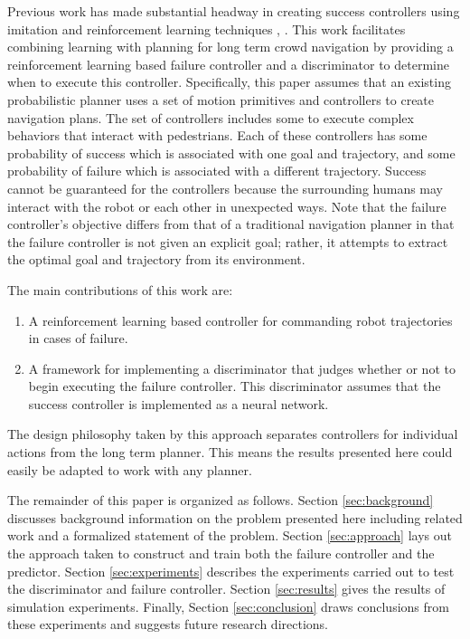 \documentclass[letterpaper]{article}
\begin{document}
		Previous work has made substantial headway in creating success controllers using imitation and reinforcement learning techniques \cite{tai2018socially}, \cite{crowdawarerl}. This work facilitates combining learning with planning for long term crowd navigation by providing a reinforcement learning based failure controller and a discriminator to determine when to execute this controller. Specifically, this paper assumes that an existing probabilistic planner uses a set of motion primitives and controllers to create navigation plans. The set of controllers includes some to execute complex behaviors that interact with pedestrians. Each of these controllers has some probability of success which is associated with one goal and trajectory, and some probability of failure which is associated with a different trajectory. Success cannot be guaranteed for the controllers because the surrounding humans may interact with the robot or each other in unexpected ways. Note that the failure controller's objective differs from that of a traditional navigation planner in that the failure controller is not given an explicit goal; rather, it attempts to extract the optimal goal and trajectory from its environment. 
		
		The main contributions of this work are:
		\begin{enumerate}
			\item A reinforcement learning based controller for commanding robot trajectories in cases of failure.
			\item A framework for implementing a discriminator that judges whether or not to begin executing the failure controller. This discriminator assumes that the success controller is implemented as a neural network.
		\end{enumerate}
		The design philosophy taken by this approach separates controllers for individual actions from the long term planner. This means the results presented here could easily be adapted to work with any planner.
		
		The remainder of this paper is organized as follows. Section \ref{sec:background} discusses background information on the problem presented here including related work and a formalized statement of the problem. Section \ref{sec:approach} lays out the approach taken to construct and train both the failure controller and the predictor. Section \ref{sec:experiments} describes the experiments carried out to test the discriminator and failure controller. Section \ref{sec:results} gives the results of simulation experiments. Finally, Section \ref{sec:conclusion} draws conclusions from these experiments and suggests future research directions.
		
\end{document}
